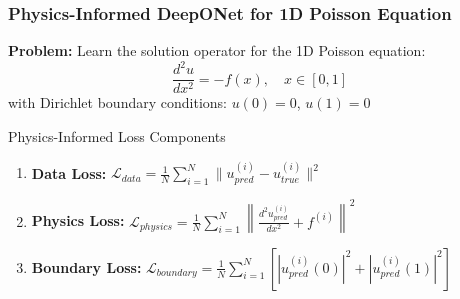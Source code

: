 \documentclass[notes]{beamer}
\begin{document}
\begin{frame}
\frametitle{Physics-Informed DeepONet for 1D Poisson Equation}

\textbf{Problem:} Learn the solution operator for the 1D Poisson equation:
\begin{equation*}
\frac{d^2u}{dx^2} = -f(x), \quad x \in [0,1]
\end{equation*}
with Dirichlet boundary conditions: $u(0) = 0$, $u(1) = 0$

\vspace{1cm}

\begin{block}{Physics-Informed Loss Components}
\begin{enumerate}
    \item \textbf{Data Loss:} $\mathcal{L}_{data} = \frac{1}{N} \sum_{i=1}^N \|u_{pred}^{(i)} - u_{true}^{(i)}\|^2$
    \item \textbf{Physics Loss:} $\mathcal{L}_{physics} = \frac{1}{N} \sum_{i=1}^N \left\|\frac{d^2u_{pred}^{(i)}}{dx^2} + f^{(i)}\right\|^2$
    \item \textbf{Boundary Loss:} $\mathcal{L}_{boundary} = \frac{1}{N} \sum_{i=1}^N \left[|u_{pred}^{(i)}(0)|^2 + |u_{pred}^{(i)}(1)|^2\right]$
\end{enumerate}
\end{block}

\vspace{0.5cm}

\centering
\href{https://colab.research.google.com/github/kks32-courses/sciml/blob/main/docs/02-deeponet/pideeponet.ipynb}{}

\end{frame}
\end{document}
